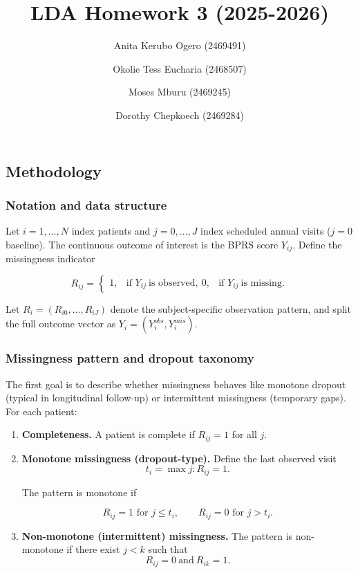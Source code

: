 \documentclass[
  11pt,
  letterpaper,
  DIV=11,
  numbers=noendperiod]{scrartcl}
\title{LDA Homework 3 (2025-2026)}
\author{Anita Kerubo Ogero (2469491) \and Okolie Tess Eucharia
(2468507) \and Moses Mburu (2469245) \and Dorothy Chepkoech (2469284)}
\date{}
\begin{document}
\maketitle


\subsection{Methodology}\label{methodology}

\subsubsection{Notation and data
structure}\label{notation-and-data-structure}

Let \(i=1,\dots,N\) index patients and \(j=0,\dots,J\) index scheduled
annual visits (\(j=0\) baseline). The continuous outcome of interest is
the BPRS score \(Y_{ij}\). Define the missingness indicator

\[
R_{ij} =
\begin{cases}
1, & \text{if } Y_{ij}\ \text{is observed},\
0, & \text{if } Y_{ij}\ \text{is missing.}
\end{cases}
\]

Let \(R_i=(R_{i0},\dots,R_{iJ})\) denote the subject-specific
observation pattern, and split the full outcome vector as
\(Y_i=(Y_i^{obs},Y_i^{mis})\).

\subsubsection{Missingness pattern and dropout
taxonomy}\label{missingness-pattern-and-dropout-taxonomy}

The first goal is to describe whether missingness behaves like monotone
dropout (typical in longitudinal follow-up) or intermittent missingness
(temporary gaps). For each patient:

\begin{enumerate}
\def\labelenumi{\arabic{enumi}.}
\item
  \textbf{Completeness.} A patient is complete if \(R_{ij}=1\) for all
  \(j\).
\item
  \textbf{Monotone missingness (dropout-type).} Define the last observed
  visit \[
  t_i=\max{j: R_{ij}=1}.
  \]

  The pattern is monotone if

  \[
  R_{ij}=1 \text{ for } j\le t_i,\qquad R_{ij}=0 \text{ for } j>t_i.
  \]
\item
  \textbf{Non-monotone (intermittent) missingness.} The pattern is
  non-monotone if there exist \(j<k\) such that \[
  R_{ij}=0 \ \text{and}\ R_{ik}=1.
  \]
\end{enumerate}
\end{document}
